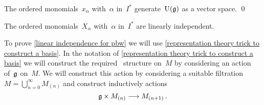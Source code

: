 \begin{corollary}
  \label{generating for pbw}
  The ordered monomials~$x_\alpha$ with~$\alpha$ in~$I^*$ generate~$\Univ(\glie)$ as a vector space.
  \qed
\end{corollary}


\begin{lemma}
  \label{linear independence for pbw}
  The ordered monomials~$X_\alpha$ with~$\alpha$ in~$I^*$ are linearly independent.
\end{lemma}


\begin{fluff}
  To prove \cref{linear independence for pbw} we will use \cref{representation theory trick to construct a basis}.
  In the notation of \cref{representation theory trick to construct a basis} we will construct the required~\module{$\Univ(\glie)$} structure on~$M$ by considering an action of~$\mathfrak{g}$ on~$M$.
  We will construct this action by considering a suitable filtration~$M = \bigcup_{n=0}^\infty M_{(n)}$ and construct inductively actions
  \[
    \glie \times M_{(n)}
    \to
    M_{(n+1)} \,.
  \]
\end{fluff}


